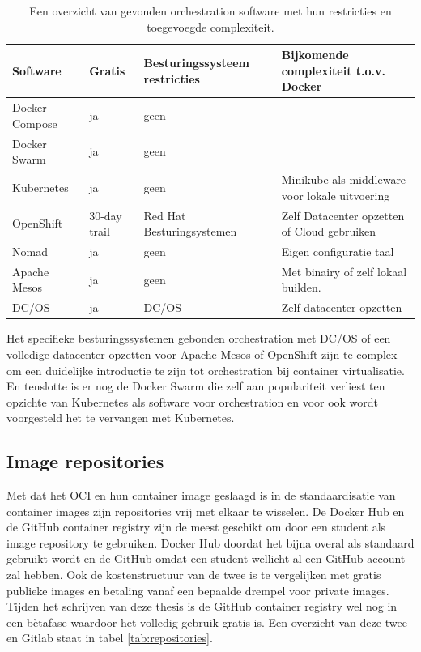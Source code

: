 \begin{center}
    \begin{table}
        \begin{tabular}{ m{3cm} || m{1.5cm} | m{3.3cm} | m{4.5cm} }
            Software & Gratis & Besturingssysteem restricties & Bijkomende complexiteit t.o.v. Docker \\ 
            \hline
            Docker Compose & ja & geen &  \\  
            \hline
            Docker Swarm & ja & geen & \\
            \hline 
            Kubernetes & ja & geen & Minikube als middleware voor lokale uitvoering \\
            \hline
            OpenShift & 30-day trail & Red Hat Besturingsystemen & Zelf Datacenter opzetten of Cloud gebruiken \\
            \hline
            Nomad & ja & geen & Eigen configuratie taal \\
            \hline
            Apache Mesos & ja & geen & Met binairy of zelf lokaal builden.  \\
            \hline 
            DC/OS & ja & DC/OS & Zelf datacenter opzetten \\
        \end{tabular}
        \caption[Overzicht orchestration]{Een overzicht van gevonden orchestration software met hun restricties en toegevoegde complexiteit.}
        \label{tab:Ochestration}
    \end{table}
\end{center}

Het specifieke besturingssystemen gebonden orchestration met DC/OS of een volledige datacenter opzetten voor Apache Mesos of OpenShift  zijn te complex om een duidelijke introductie te zijn tot orchestration bij container virtualisatie. En tenslotte is er nog de Docker Swarm die zelf aan populariteit verliest ten opzichte van Kubernetes als software voor orchestration en voor ook wordt voorgesteld het te vervangen met Kubernetes.


\subsection{Image repositories}
Met dat het OCI en hun container image geslaagd is in de standaardisatie van container images zijn repositories vrij met elkaar te wisselen. De Docker Hub en de GitHub container registry zijn de meest geschikt om door een student als image repository te gebruiken.  Docker Hub doordat het bijna overal als standaard gebruikt wordt en de GitHub omdat een student wellicht al een GitHub account zal hebben. Ook de kostenstructuur van de twee is te vergelijken met gratis publieke images en betaling vanaf een bepaalde drempel voor private images. Tijden het schrijven van deze thesis is de GitHub container registry wel nog in een bètafase waardoor het volledig gebruik gratis is. Een overzicht van deze twee en Gitlab staat in tabel \ref{tab:repositories}.


